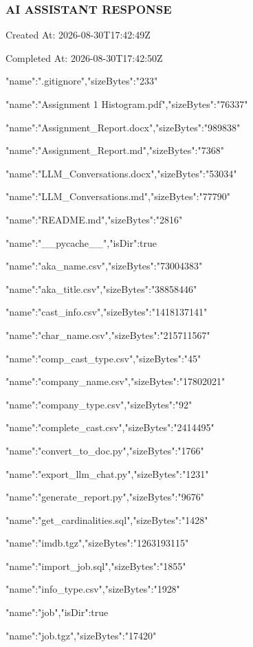 \documentclass[11pt,a4paper]{article}
\begin{document}
{\subsubsection{AI ASSISTANT RESPONSE}

Created At: 2026-08-30T17:42:49Z

Completed At: 2026-08-30T17:42:50Z

{"name":".gitignore","sizeBytes":"233"}

{"name":"Assignment 1 Histogram.pdf","sizeBytes":"76337"}

{"name":"Assignment\_Report.docx","sizeBytes":"989838"}

{"name":"Assignment\_Report.md","sizeBytes":"7368"}

{"name":"LLM\_Conversations.docx","sizeBytes":"53034"}

{"name":"LLM\_Conversations.md","sizeBytes":"77790"}

{"name":"README.md","sizeBytes":"2816"}

{"name":"\_\_pycache\_\_","isDir":true}

{"name":"aka\_name.csv","sizeBytes":"73004383"}

{"name":"aka\_title.csv","sizeBytes":"38858446"}

{"name":"cast\_info.csv","sizeBytes":"1418137141"}

{"name":"char\_name.csv","sizeBytes":"215711567"}

{"name":"comp\_cast\_type.csv","sizeBytes":"45"}

{"name":"company\_name.csv","sizeBytes":"17802021"}

{"name":"company\_type.csv","sizeBytes":"92"}

{"name":"complete\_cast.csv","sizeBytes":"2414495"}

{"name":"convert\_to\_doc.py","sizeBytes":"1766"}

{"name":"export\_llm\_chat.py","sizeBytes":"1231"}

{"name":"generate\_report.py","sizeBytes":"9676"}

{"name":"get\_cardinalities.sql","sizeBytes":"1428"}

{"name":"imdb.tgz","sizeBytes":"1263193115"}

{"name":"import\_job.sql","sizeBytes":"1855"}

{"name":"info\_type.csv","sizeBytes":"1928"}

{"name":"job","isDir":true}

{"name":"job.tgz","sizeBytes":"17420"}

}
\end{document}
